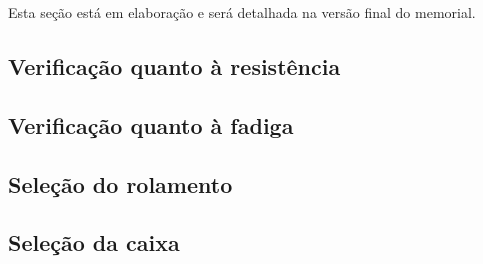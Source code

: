 Esta seção está em elaboração e será detalhada na versão final do memorial.

\subsection{Verificação quanto à resistência}


\subsection{Verificação quanto à fadiga}


\subsection{Seleção do rolamento}


\subsection{Seleção da caixa}

